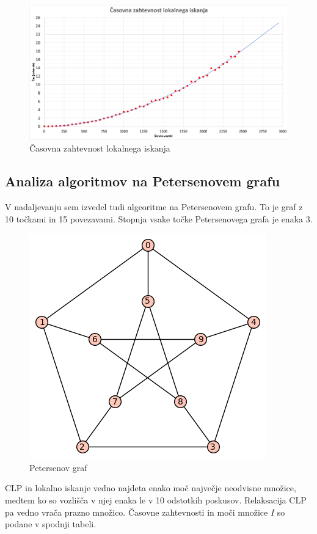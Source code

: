 \documentclass[a4paper, 12 pt]{article}
\theoremstyle{definition}
\theoremstyle{plain}
\theoremstyle{remark}
\begin{document}
\begin{figure}[H]
\centering
  \includegraphics[scale=0.29]{./Slike/casovna_ zahtevnost_LOKISK.png}
  \caption{Časovna zahtevnost lokalnega iskanja}
  \label{fig:casovna zahtevnost} 
\end{figure}


\subsection{Analiza algoritmov na Petersenovem grafu}
V nadaljevanju sem izvedel tudi algeoritme na Petersenovem grafu. To je graf z 10 točkami in 15 povezavami. Stopnja vsake točke Petersenovega grafa je enaka 3.


\begin{figure}[H]
\centering
  \includegraphics[scale=0.35]{./Slike/Petersenov graf.png}
  \caption{Petersenov graf}
\end{figure}

CLP in lokalno iskanje vedno najdeta enako moč največje neodvisne množice, medtem ko so vozlišča v njej enaka le v 10 odstotkih poskusov. Relaksacija CLP pa vedno vrača prazno množico. Časovne zahtevnosti in moči množice $I$ so podane v spodnji tabeli.
\end{document}

